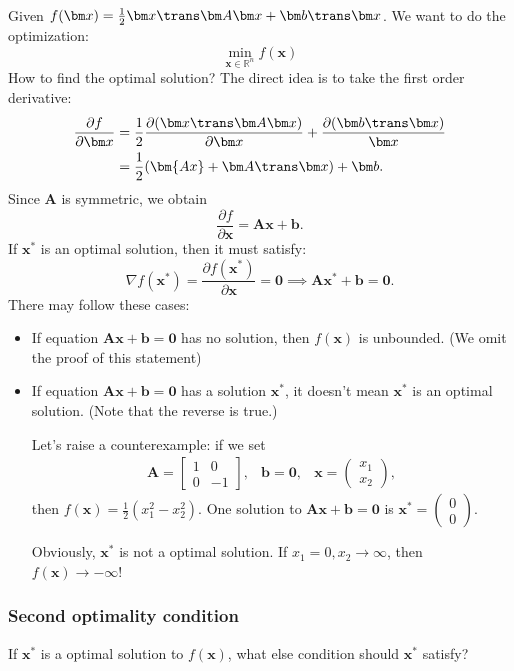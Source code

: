\begin{example}\qquad\\
Given $f(\bm x)=\frac{1}{2}\bm x\trans\bm A\bm x+\bm b\trans\bm x$. We want to do the optimization:
\[
\min_{\bm x\in\mathbb{R}^{n}}f(\bm x)
\]
How to find the optimal solution? The direct idea is to take the first order derivative:
\begin{align*}
\frac{\partial f}{\partial \bm x}&=\frac{1}{2}\frac{\partial(\bm x\trans\bm A\bm x)}{\partial \bm x}+\frac{\partial(\bm b\trans\bm x)}{\bm x}\\
&=\frac{1}{2}(\bm{Ax}+\bm A\trans\bm x)+\bm b.
\end{align*}
Since $\bm A$ is symmetric, we obtain
\[
\frac{\partial f}{\partial \bm x}=\bm{Ax}+\bm b.
\]
If $\bm x^{*}$ is an optimal solution, then it must satisfy:
\[
\nabla f(\bm x^{*})=\frac{\partial f(\bm x^{*})}{\partial \bm x}=\bm 0\implies
\bm A\bm x^{*}+\bm b=\bm 0.
\]
There may follow these cases:
\begin{itemize}
\item
If equation $\bm{Ax}+\bm b=\bm 0$ has no solution, then $f(\bm x)$ is unbounded. (We omit the proof of this statement)
\item
If equation $\bm{Ax}+\bm b=\bm 0$ has a solution $\bm x^{*}$, it doesn't mean $\bm x^{*}$ is an optimal solution. (Note that the reverse is true.)

Let's raise a counterexample: if we set
\[
\begin{array}{lll}
\bm A=\begin{bmatrix}
1&0\\0&-1
\end{bmatrix},
&
\bm b=\bm 0,
&
\bm x=\begin{pmatrix}
x_1\\x_2
\end{pmatrix},
\end{array}
\]
then $f(\bm x)=\frac{1}{2}(x_1^2-x_2^2)$. One solution to $\bm{Ax}+\bm b=\bm 0$ is $\bm x^*=\begin{pmatrix}
0\\0
\end{pmatrix}$. 

Obviously, $\bm x^{*}$ is not a optimal solution. If $x_1=0,x_2\rightarrow\infty$, then $f(\bm x)\rightarrow-\infty$!
\end{itemize}
\end{example}

\subsubsection{Second optimality condition}
If $\bm x^{*}$ is a optimal solution to $f(\bm x)$, what else condition should $\bm x^{*}$ satisfy?

